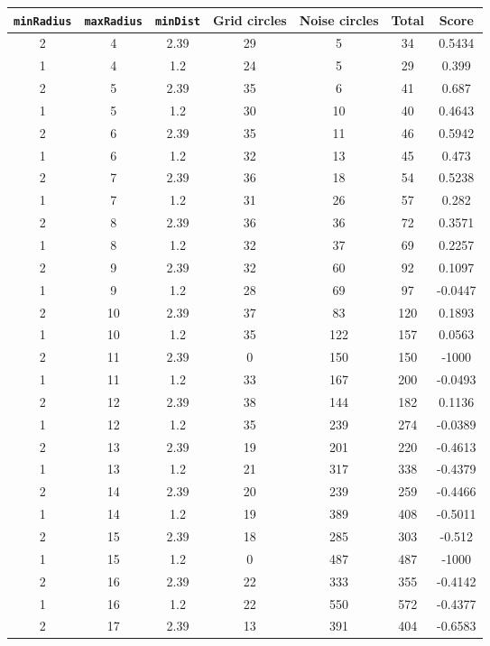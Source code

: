 \documentclass[letterpaper, 12pt]{article}
\begin{document}
\begin{longtable}{|c|c|c|c|c|c|c|}
\hline
\textbf{\texttt{minRadius}} & \textbf{\texttt{maxRadius}} & \textbf{\texttt{minDist}} & \textbf{Grid circles} & \textbf{Noise circles} & \textbf{Total} & \textbf{Score} \\
\hline
2 & 4 & 2.39 & 29 & 5 & 34 & 0.5434 \\
\hline
1 & 4 & 1.2 & 24 & 5 & 29 & 0.399 \\
\hline
2 & 5 & 2.39 & 35 & 6 & 41 & 0.687 \\
\hline
1 & 5 & 1.2 & 30 & 10 & 40 & 0.4643 \\
\hline
2 & 6 & 2.39 & 35 & 11 & 46 & 0.5942 \\
\hline
1 & 6 & 1.2 & 32 & 13 & 45 & 0.473 \\
\hline
2 & 7 & 2.39 & 36 & 18 & 54 & 0.5238 \\
\hline
1 & 7 & 1.2 & 31 & 26 & 57 & 0.282 \\
\hline
2 & 8 & 2.39 & 36 & 36 & 72 & 0.3571 \\
\hline
1 & 8 & 1.2 & 32 & 37 & 69 & 0.2257 \\
\hline
2 & 9 & 2.39 & 32 & 60 & 92 & 0.1097 \\
\hline
1 & 9 & 1.2 & 28 & 69 & 97 & -0.0447 \\
\hline
2 & 10 & 2.39 & 37 & 83 & 120 & 0.1893 \\
\hline
1 & 10 & 1.2 & 35 & 122 & 157 & 0.0563 \\
\hline
2 & 11 & 2.39 & 0 & 150 & 150 & -1000 \\
\hline
1 & 11 & 1.2 & 33 & 167 & 200 & -0.0493 \\
\hline
2 & 12 & 2.39 & 38 & 144 & 182 & 0.1136 \\
\hline
1 & 12 & 1.2 & 35 & 239 & 274 & -0.0389 \\
\hline
2 & 13 & 2.39 & 19 & 201 & 220 & -0.4613 \\
\hline
1 & 13 & 1.2 & 21 & 317 & 338 & -0.4379 \\
\hline
2 & 14 & 2.39 & 20 & 239 & 259 & -0.4466 \\
\hline
1 & 14 & 1.2 & 19 & 389 & 408 & -0.5011 \\
\hline
2 & 15 & 2.39 & 18 & 285 & 303 & -0.512 \\
\hline
1 & 15 & 1.2 & 0 & 487 & 487 & -1000 \\
\hline
2 & 16 & 2.39 & 22 & 333 & 355 & -0.4142 \\
\hline
1 & 16 & 1.2 & 22 & 550 & 572 & -0.4377 \\
\hline
2 & 17 & 2.39 & 13 & 391 & 404 & -0.6583 \\

\end{longtable}
\end{document}

